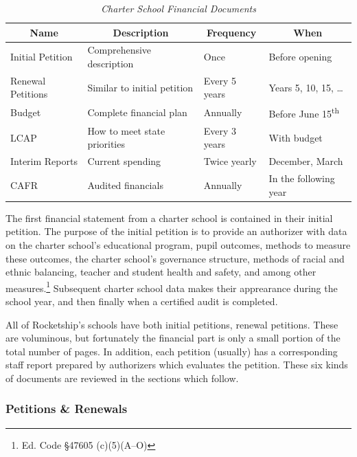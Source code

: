 \begin{table}[h]
  \centering\small%
  \caption[Charter School Financial Documents]{\textit{Charter School Financial Documents}}\label{tab:charter-fin-docs}%
  \begin{tabular}{llll}
    \toprule%
    \multicolumn{1}{c}{Name}  & \multicolumn{1}{c}{Description} & \multicolumn{1}{c}{Frequency} & \multicolumn{1}{c}{When} \\
    \midrule%
    Initial Petition  & Comprehensive description    & Once           & Before opening \\
    Renewal Petitions & Similar to initial petition  & Every 5 years  & Years 5, 10, 15, \ldots \\
    Budget            & Complete financial plan      & Annually       & Before June 15\textsuperscript{th} \\
    LCAP              & How to meet state priorities & Every 3 years  & With budget\\
    Interim Reports   & Current spending             & Twice yearly   & December, March \\
    CAFR              & Audited financials           & Annually       & In the following year \\
    \bottomrule%
  \end{tabular}
\end{table}%

The first financial statement from a charter school is contained in their initial petition. The purpose of the initial petition is to provide an authorizer with data on the charter school's educational program, pupil outcomes, methods to measure these outcomes, the charter school's governance structure, methods of racial and ethnic balancing, teacher and student health and safety, and among other measures.\footnote{Ed. Code §47605 (c)(5)(A–O)} Subsequent charter school data makes their apprearance during the school year, and then finally when a certified audit is completed.

All of Rocketship's schools have both initial petitions, renewal petitions. These are voluminous, but fortunately the financial part is only a small portion of the total number of pages. In addition, each petition (usually) has a corresponding staff report prepared by authorizers which evaluates the petition. These six kinds of documents are reviewed in the sections which follow.

\subsubsection{Petitions \& Renewals}\label{sec:cs-petitions-renewals}\indent

